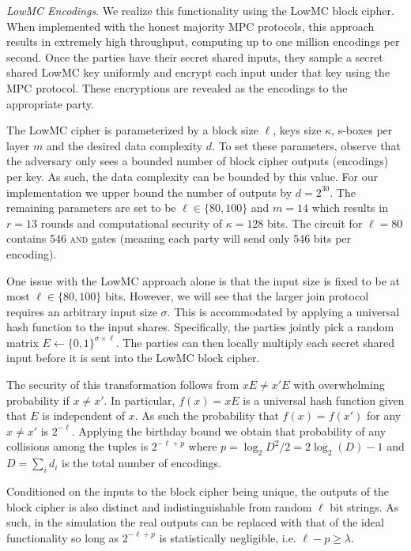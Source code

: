 \documentclass[11pt,letterpaper]{article}
\renewcommand{\paragraph}[1]{\vspace{0.1cm}\noindent\emph{#1}.}
\begin{document}
\paragraph{LowMC Encodings}
We realize this functionality using the LowMC block cipher\cite{lowmc}. When implemented with the honest majority MPC protocols\cite{highthroughput}, this approach results in extremely high throughput, computing up to one million encodings per second. Once the parties have their secret shared inputs, they sample a secret shared LowMC key uniformly and encrypt each input under that key using the MPC protocol. These encryptions are revealed as the encodings to the appropriate party.


The LowMC cipher is parameterized by a block size $\ell$, keys size $\kappa$, s-boxes per layer $m$ and the desired data complexity $d$. To set these parameters, observe that the adversary only sees a bounded number of block cipher outputs (encodings) per key. As such, the data complexity can be bounded by this value. For our implementation we upper bound the number of outputs by $d= 2^{30}$. The remaining parameters are set to be $\ell\in\{80, 100\}$ and $m=14$ which results in $r=13$ rounds and computational security of $\kappa=128$ bits\cite{lowmc}. The circuit for $\ell=80$ contains 546 \textsc{and} gates (meaning each party will send only 546 bits per encoding).

One issue with the LowMC approach alone is that the input size is fixed to be at most $\ell\in\{80,100\}$ bits. However, we will see that the larger join protocol requires an arbitrary input size $\sigma$. This is accommodated by applying a universal hash function to the input shares. Specifically, the parties jointly pick a random matrix $E\gets\{0,1\}^{\sigma\times \ell}$. The parties can then locally multiply each secret shared input before it is sent into the LowMC block cipher.

The security of this transformation follows from $xE\neq x'E$ with overwhelming probability if $x\neq x'$. In particular, $f(x)=xE$ is a universal hash function given that $E$ is independent of $x$. As such the probability that $f(x)=f(x')$ for any $x\neq x'$  is $2^{-\ell}$. Applying the birthday bound we obtain that probability of any collisions among the tuples is $2^{-\ell+p}$ where $p=\log_2 D^2/2=2\log_2(D)-1$ and $D=\sum_i d_i$ is the total number of encodings.

Conditioned on the inputs to the block cipher being unique, the outputs of the block cipher is also distinct and indistinguishable from random $\ell$ bit strings. As such, in the simulation the real outputs can be replaced with that of the ideal functionality so long as $2^{-\ell+p}$ is statistically negligible, i.e. $\ell-p\geq\lambda$.
\end{document}
